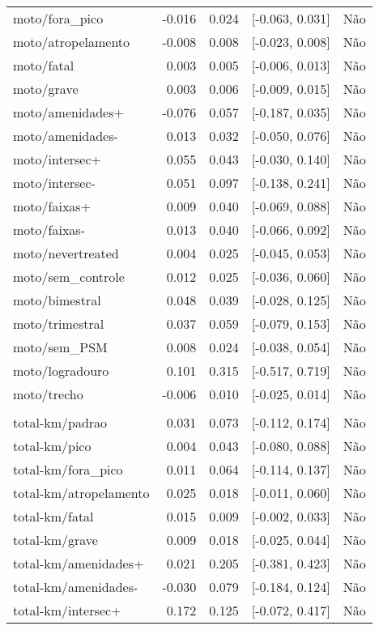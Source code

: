 \begin{longtable}{lrrcl}
moto/fora\_pico & -0.016 & 0.024 & {}[-0.063, 0.031] & Não\\
moto/atropelamento & -0.008 & 0.008 & {}[-0.023, 0.008] & Não\\
moto/fatal & 0.003 & 0.005 & {}[-0.006, 0.013] & Não\\
moto/grave & 0.003 & 0.006 & {}[-0.009, 0.015] & Não\\
moto/amenidades+ & -0.076 & 0.057 & {}[-0.187, 0.035] & Não\\
moto/amenidades- & 0.013 & 0.032 & {}[-0.050, 0.076] & Não\\
moto/intersec+ & 0.055 & 0.043 & {}[-0.030, 0.140] & Não\\
moto/intersec- & 0.051 & 0.097 & {}[-0.138, 0.241] & Não\\
moto/faixas+ & 0.009 & 0.040 & {}[-0.069, 0.088] & Não\\
moto/faixas- & 0.013 & 0.040 & {}[-0.066, 0.092] & Não\\
moto/nevertreated & 0.004 & 0.025 & {}[-0.045, 0.053] & Não\\
moto/sem\_controle & 0.012 & 0.025 & {}[-0.036, 0.060] & Não\\
moto/bimestral & 0.048 & 0.039 & {}[-0.028, 0.125] & Não\\
moto/trimestral & 0.037 & 0.059 & {}[-0.079, 0.153] & Não\\
moto/sem\_PSM & 0.008 & 0.024 & {}[-0.038, 0.054] & Não\\
moto/logradouro & 0.101 & 0.315 & {}[-0.517, 0.719] & Não\\
moto/trecho & -0.006 & 0.010 & {}[-0.025, 0.014] & Não\\
 &  &  &  & \\
total-km/padrao & 0.031 & 0.073 & {}[-0.112, 0.174] & Não\\
total-km/pico & 0.004 & 0.043 & {}[-0.080, 0.088] & Não\\
total-km/fora\_pico & 0.011 & 0.064 & {}[-0.114, 0.137] & Não\\
total-km/atropelamento & 0.025 & 0.018 & {}[-0.011, 0.060] & Não\\
total-km/fatal & 0.015 & 0.009 & {}[-0.002, 0.033] & Não\\
total-km/grave & 0.009 & 0.018 & {}[-0.025, 0.044] & Não\\
total-km/amenidades+ & 0.021 & 0.205 & {}[-0.381, 0.423] & Não\\
total-km/amenidades- & -0.030 & 0.079 & {}[-0.184, 0.124] & Não\\
total-km/intersec+ & 0.172 & 0.125 & {}[-0.072, 0.417] & Não\\

\end{longtable}
